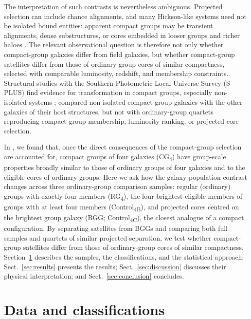\documentclass{aa}
\newcommand{\CB}{Control\textsubscript{4B}}
\newcommand{\CC}{Control\textsubscript{4C}}
\newcommand{\CG}{CG\textsubscript{4}}
\newcommand{\RG}{RG\textsubscript{4}}
\begin{document}
The interpretation of such contrasts is nevertheless ambiguous. Projected selection can include chance alignments, and many Hickson-like systems need not be isolated bound entities: apparent compact groups may be transient alignments, dense substructures, or cores embedded in looser groups and richer haloes \citep{Mamon86,DiazGimenez&Mamon10,DiazGimenez+20,Zheng&Shen21,Taverna+23}. The relevant observational question is therefore not only whether compact-group galaxies differ from field galaxies, but whether compact-group satellites differ from those of ordinary-group cores of similar compactness, selected with comparable luminosity, redshift, and membership constraints. Structural studies with the Southern Photometric Local Universe Survey (S-PLUS) find evidence for transformation in compact groups, especially non-isolated systems \citep{Montaguth2023,Montaguth2025,Montaguth2026MassSize,Montaguth2026NonIsolated}; \citet{Montaguth2026NonIsolated} compared non-isolated compact-group galaxies with the other galaxies of their host structures, but not with ordinary-group quartets reproducing compact-group membership, luminosity ranking, or projected-core selection.

In \citet[hereafter Paper~I]{Tricottet+25}, we found that, once the direct consequences of the compact-group selection are accounted for, compact groups of four galaxies (\CG) have group-scale properties broadly similar to those of ordinary groups of four galaxies and to the eligible cores of ordinary groups. Here we ask how the galaxy-population contrast changes across three ordinary-group comparison samples: regular (ordinary) groups with exactly four members (\RG{}), the four brightest eligible members of groups with at least four members (\CB{}), and projected cores centred on the brightest group galaxy (BGG; \CC{}), the closest analogue of a compact configuration. By separating satellites from BGGs and comparing both full samples and quartets of similar projected separation, we test whether compact-group satellites differ from those of ordinary-group cores of similar compactness. Section~\ref{sec:data} describes the samples, the classifications, and the statistical approach; Sect.~\ref{sec:results} presents the results; Sect.~\ref{sec:discussion} discusses their physical interpretation; and Sect.~\ref{sec:conclusion} concludes.

\section{Data and classifications}\label{sec:data}
\end{document}
